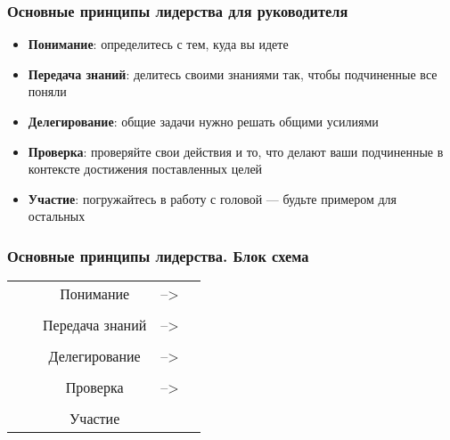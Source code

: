 \documentclass{../industrial-development}
\begin{document}
\begin{frame} \frametitle {Основные принципы лидерства для руководителя}

\begin{itemize}
	\item \textbf{Понимание}: определитесь с тем, куда вы идете
	\item \textbf{Передача знаний}: делитесь своими знаниями так, чтобы подчиненные все поняли
	\item \textbf{Делегирование}: общие задачи нужно решать общими усилиями
	\item \textbf{Проверка}: проверяйте свои действия и то, что делают ваши подчиненные в контексте достижения 	поставленных целей
	\item \textbf{Участие}: погружайтесь в работу с головой --- будьте примером для остальных
\end{itemize}
\end{frame}

\begin{frame} \frametitle {Основные принципы лидерства. Блок схема}

\begin{table}[]
\begin{tabular}{lllll}
\cline{3-3}
\multicolumn{1}{c}{} & \multicolumn{1}{l|}{} & \multicolumn{1}{c|}{Понимание}       & --\textgreater{} & \multicolumn{1}{c}{} \\ \cline{3-3}
                     &                       &                                      &                  &                      \\ \cline{3-3}
                     & \multicolumn{1}{l|}{} & \multicolumn{1}{l|}{Передача знаний} & --\textgreater{} &                      \\ \cline{3-3}
                     &                       &                                      &                  &                      \\ \cline{3-3}
                     & \multicolumn{1}{l|}{} & \multicolumn{1}{c|}{Делегирование}   & --\textgreater{} &                      \\ \cline{3-3}
                     &                       &                                      &                  &                      \\ \cline{3-3}
                     & \multicolumn{1}{l|}{} & \multicolumn{1}{c|}{Проверка}        & --\textgreater{} &                      \\ \cline{3-3}
                     &                       &                                      &                  &                      \\ \cline{3-3}
\multicolumn{1}{c}{} & \multicolumn{1}{l|}{} & \multicolumn{1}{c|}{Участие}         &                  &                      \\ \cline{3-3}
\end{tabular}
\end{table}

\end{frame}
\end{document}
